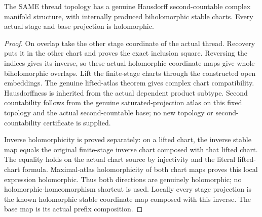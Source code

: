 \begin{lemma}
\label{hir:actual-thread-lf-complex-atlas}
\leanok
{}
The SAME thread topology has a genuine Hausdorff second-countable complex
manifold structure, with internally produced biholomorphic stable charts.
Every actual stage and base projection is holomorphic.
\end{lemma}
\begin{proof}
On overlap take the other stage coordinate of the actual thread. Recovery
puts it in the other chart and proves the exact inclusion square. Reversing
the indices gives its inverse, so these actual holomorphic coordinate maps
give whole biholomorphic overlaps. Lift the finite-stage charts through the
constructed open embeddings. The genuine lifted-atlas theorem gives complex
chart compatibility. Hausdorffness is inherited from the actual dependent product subtype.
Second countability follows from the genuine saturated-projection atlas
on this fixed topology and the actual second-countable base; no new topology
or second-countability certificate is supplied.

Inverse holomorphicity is proved separately: on a lifted chart, the inverse
stable map equals the original finite-stage inverse chart composed with that
lifted chart. The equality holds on the actual chart source by injectivity
and the literal lifted-chart formula. Maximal-atlas holomorphicity of both
chart maps proves this local expression holomorphic. Thus both directions
are genuinely holomorphic; no holomorphic-homeomorphism shortcut is used.
Locally every stage projection is the known holomorphic stable coordinate
map composed with this inverse. The base map is its actual prefix composition.
\end{proof}

